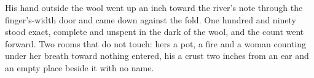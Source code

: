 His hand outside the wool went up an inch toward the river's note through the finger's-width door and came down against the fold. One hundred and ninety stood exact, complete and unspent in the dark of the wool, and the count went forward. Two rooms that do not touch: hers a pot, a fire and a woman counting under her breath toward nothing entered, his a crust two inches from an ear and an empty place beside it with no name.
